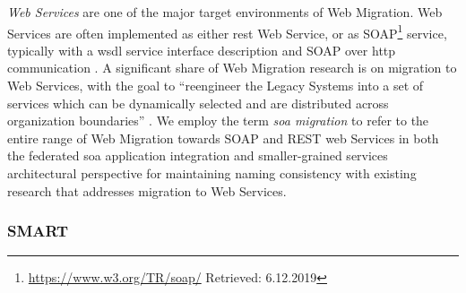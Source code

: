 \emph{Web Services} are one of the major target environments of \gls{Web Migration}.
Web Services are often implemented as either \gls{rest} \autocite{Fielding2017REST} Web Service, or as SOAP\footnote{\url{https://www.w3.org/TR/soap/} Retrieved: 6.12.2019} service, typically with a \gls{wsdl} service interface description and SOAP over \gls{http} communication \autocite{Lewis2008SMART}.
A significant share of \gls{Web Migration} research is on migration to Web Services, with the goal to ``reengineer the \glspl{Legacy System} into a set of services which can be dynamically selected and are distributed across organization boundaries'' \autocite{Razavian2014a}.
We employ the term \emph{\gls{soa} migration} to refer to the entire range of \gls{Web Migration} towards SOAP and REST \gls{web} Services in both the federated \gls{soa} application integration and smaller-grained services architectural perspective for maintaining naming consistency with existing research \autocite{Khadka2013SurveySOAMigration,Razavian2011SOASurvey,Almonaies2010SOAStrategies} that addresses migration to Web Services.



\hypertarget{smart}{%
\subsubsection*{SMART}\label{smart}}

